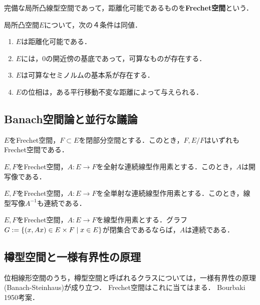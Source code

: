 \documentclass[uplatex,dvipdfmx]{jsreport}
\begin{document}
\begin{definition}
    完備な局所凸線型空間であって，距離化可能であるものを\textbf{Frechet空間}という．
\end{definition}

\begin{lemma}[Frechet空間の特徴付け]
    局所凸空間$E$について，次の４条件は同値．
    \begin{enumerate}
        \item $E$は距離化可能である．
        \item $E$には，$0$の開近傍の基底であって，可算なものが存在する．
        \item $E$は可算なセミノルムの基本系が存在する．
        \item $E$の位相は，ある平行移動不変な距離によって与えられる．
    \end{enumerate}
\end{lemma}

\subsection{Banach空間論と並行な議論}

\begin{proposition}
    $E$をFrechet空間，$F\subset E$を閉部分空間とする．このとき，$F,E/F$はいずれもFrechet空間である．
\end{proposition}

\begin{theorem}[開写像定理]
    $E,F$をFrechet空間，$A:E\to F$を全射な連続線型作用素とする．このとき，$A$は開写像である．
\end{theorem}

\begin{corollary}[逆写像定理]
    $E,F$をFrechet空間，$A:E\to F$を全単射な連続線型作用素とする．このとき，線型写像$A^{-1}$も連続である．
\end{corollary}

\begin{theorem}[閉グラフ定理]
    $E,F$をFrechet空間，$A:E\to F$を線型作用素とする．グラフ$G:=\left\{(x,Ax)\in E\times F\mid x\in E\right\}$が閉集合であるならば，$A$は連続である．
\end{theorem}

\subsection{樽型空間と一様有界性の原理}

\begin{tcolorbox}[colframe=ForestGreen, colback=ForestGreen!10!white,breakable,colbacktitle=ForestGreen!40!white,coltitle=black,fonttitle=\bfseries\sffamily,
title=]
    位相線形空間のうち，樽型空間と呼ばれるクラスについては，一様有界性の原理(Banach-Steinhaus)が成り立つ．
    Frechet空間はこれに当てはまる．
    Bourbaki 1950考案．
\end{tcolorbox}
\end{document}
